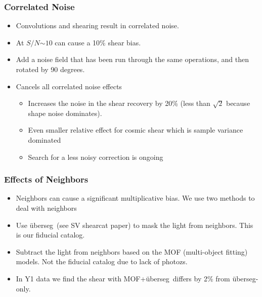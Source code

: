 \documentclass{beamer}
\newcommand{\snr}{$S/N$}
\newcommand{\uberseg}{{\"u}berseg}
\begin{document}
\frame
{
    \frametitle{Correlated Noise}

 

    \begin{itemize}

        \item Convolutions and shearing result in correlated noise.

        \item At \snr$\sim 10$ can cause a 10\% shear bias.

        \item Add a noise field that has been run through the same
            operations, and then rotated by 90 degrees.

        \item Cancels all correlated noise effects
            
            \begin{itemize}
                \item Increases the noise in the shear recovery by 20\% (less
                    than $\sqrt 2$ because shape noise dominates).

                \item Even smaller relative effect
                    for cosmic shear which is sample variance dominated
                \item Search for a less noisy correction is ongoing
             \end{itemize}
    \end{itemize}

}


\frame
{

 
    \frametitle{Effects of Neighbors}

    \begin{itemize}

        \item Neighbors can cause a significant multiplicative bias.
            We use two methods to deal with neighbors
            
        \item Use \uberseg\ (see SV shearcat paper) to mask the light from
            neighbors.  This is our fiducial catalog.

        \item Subtract the light from neighbors based on the
            MOF (multi-object fitting) models.  Not the fiducial
            catalog due to
            lack of photozs.

        \item In Y1 data we find the shear with MOF+\uberseg\ differs
            by 2\% from \uberseg-only.

    \end{itemize}
}
\end{document}
